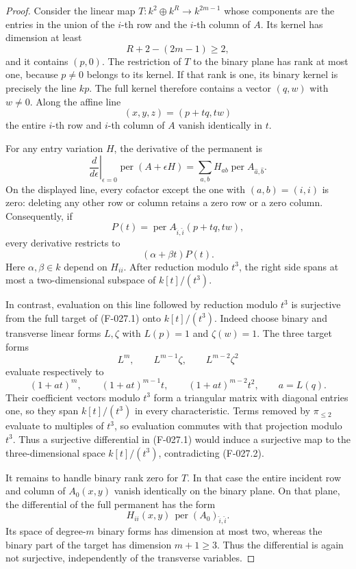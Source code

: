 \begin{proof}
Consider the linear map \(T:k^2\oplus k^R\to k^{2m-1}\)
whose components are the entries in the union of the
\(i\)-th row and the \(i\)-th column of \(A\).
Its kernel has dimension at least
\[
                   R+2-(2m-1)\geq2,
\]
and it contains \((p,0)\).
The restriction of \(T\) to the binary plane has rank
at most one, because \(p\ne0\) belongs to its kernel.
If that rank is one, its binary kernel is precisely
the line \(kp\). The full kernel therefore contains
a vector \((q,w)\) with \(w\ne0\).
Along the affine line
\[
                     (x,y,z)=(p+tq,tw)
\]
the entire \(i\)-th row and \(i\)-th column of \(A\)
vanish identically in \(t\).

For any entry variation \(H\), the derivative of the
permanent is
\[
 \left.\frac{d}{d\epsilon}\right|_{\epsilon=0}
        \operatorname{per}(A+\epsilon H)
   =\sum_{a,b}H_{ab}\operatorname{per}A_{\widehat a,\widehat b}.
\]
On the displayed line, every cofactor except the one
with \((a,b)=(i,i)\) is zero: deleting any other row or
column retains a zero row or a zero column. Consequently,
if
\[
 P(t)=\operatorname{per}A_{\widehat i,\widehat i}(p+tq,tw),
\]
every derivative restricts to
\[
                    (\alpha+\beta t)P(t).
                                                               \tag{F-027.2}
\]
Here \(\alpha,\beta\in k\) depend on \(H_{ii}\).
After reduction modulo \(t^3\), the right side spans
at most a two-dimensional subspace of \(k[t]/(t^3)\).

In contrast, evaluation on this line followed by reduction
modulo \(t^3\) is surjective from the full target of
(F-027.1) onto \(k[t]/(t^3)\). Indeed choose binary
and transverse linear forms \(L,\zeta\) with
\(L(p)=1\) and \(\zeta(w)=1\). The three target forms
\[
                  L^m,\qquad L^{m-1}\zeta,\qquad
                           L^{m-2}\zeta^2
                                                               \tag{F-027.3}
\]
evaluate respectively to
\[
             (1+at)^m,\qquad (1+at)^{m-1}t,\qquad
                       (1+at)^{m-2}t^2,\qquad a=L(q).
\]
Their coefficient vectors modulo \(t^3\) form a triangular
matrix with diagonal entries one, so they span
\(k[t]/(t^3)\) in every characteristic.
Terms removed by \(\pi_{\leq2}\) evaluate to multiples
of \(t^3\), so evaluation commutes with that projection
modulo \(t^3\).
Thus a surjective differential in (F-027.1) would induce
a surjective map to the three-dimensional space
\(k[t]/(t^3)\), contradicting (F-027.2).

It remains to handle binary rank zero for \(T\).
In that case the entire incident row and column of
\(A_0(x,y)\) vanish identically on the binary plane.
On that plane, the differential of the full permanent
has the form
\[
               H_{ii}(x,y)\,
                    \operatorname{per}(A_0)_{\widehat i,\widehat i}.
\]
Its space of degree-\(m\) binary forms has dimension
at most two, whereas the binary part of the target
has dimension \(m+1\geq3\). Thus the differential is
again not surjective, independently of the transverse
variables.


\end{proof}
